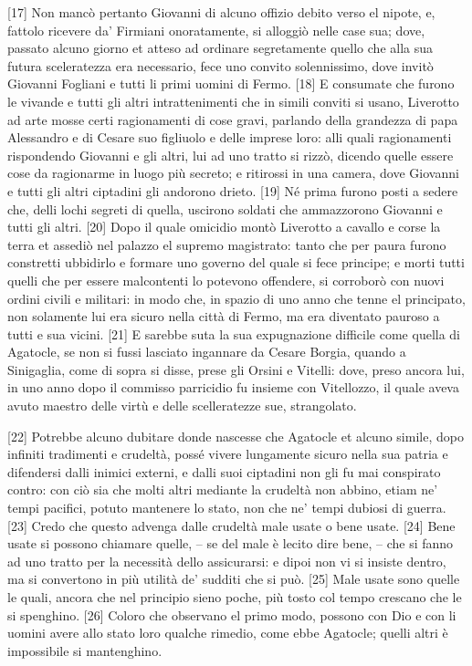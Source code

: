 {[}17{]} Non mancò pertanto Giovanni di alcuno offizio debito verso el
nipote, e, fattolo ricevere da' Firmiani onoratamente, si alloggiò nelle
case sua; dove, passato alcuno giorno et atteso ad ordinare segretamente
quello che alla sua futura sceleratezza era necessario, fece uno convito
solennissimo, dove invitò Giovanni Fogliani e tutti li primi uomini di
Fermo. {[}18{]} E consumate che furono le vivande e tutti gli altri
intrattenimenti che in simili conviti si usano, Liverotto ad arte mosse
certi ragionamenti di cose gravi, parlando della grandezza di papa
Alessandro e di Cesare suo figliuolo e delle imprese loro: alli quali
ragionamenti rispondendo Giovanni e gli altri, lui ad uno tratto si
rizzò, dicendo quelle essere cose da ragionarme in luogo più secreto; e
ritirossi in una camera, dove Giovanni e tutti gli altri ciptadini gli
andorono drieto. {[}19{]} Né prima furono posti a sedere che, delli
lochi segreti di quella, uscirono soldati che ammazzorono Giovanni e
tutti gli altri. {[}20{]} Dopo il quale omicidio montò Liverotto a
cavallo e corse la terra et assediò nel palazzo el supremo magistrato:
tanto che per paura furono constretti ubbidirlo e formare uno governo
del quale si fece principe; e morti tutti quelli che per essere
malcontenti lo potevono offendere, si corroborò con nuovi ordini civili
e militari: in modo che, in spazio di uno anno che tenne el principato,
non solamente lui era sicuro nella città di Fermo, ma era diventato
pauroso a tutti e sua vicini. {[}21{]} E sarebbe suta la sua
expugnazione difficile come quella di Agatocle, se non si fussi lasciato
ingannare da Cesare Borgia, quando a Sinigaglia, come di sopra si disse,
prese gli Orsini e Vitelli: dove, preso ancora lui, in uno anno dopo il
commisso parricidio fu insieme con Vitellozzo, il quale aveva avuto
maestro delle virtù e delle scelleratezze sue, strangolato.

{[}22{]} Potrebbe alcuno dubitare donde nascesse che Agatocle et alcuno
simile, dopo infiniti tradimenti e crudeltà, possé vivere lungamente
sicuro nella sua patria e difendersi dalli inimici externi, e dalli suoi
ciptadini non gli fu mai conspirato contro: con ciò sia che molti altri
mediante la crudeltà non abbino, etiam ne' tempi pacifici, potuto
mantenere lo stato, non che ne' tempi dubiosi di guerra. {[}23{]} Credo
che questo advenga dalle crudeltà male usate o bene usate. {[}24{]} Bene
usate si possono chiamare quelle, -- se del male è lecito dire bene, --
che si fanno ad uno tratto per la necessità dello assicurarsi: e dipoi
non vi si insiste dentro, ma si convertono in più utilità de' sudditi
che si può. {[}25{]} Male usate sono quelle le quali, ancora che nel
principio sieno poche, più tosto col tempo crescano che le si spenghino.
{[}26{]} Coloro che observano el primo modo, possono con Dio e con li
uomini avere allo stato loro qualche rimedio, come ebbe Agatocle; quelli
altri è impossibile si mantenghino.

